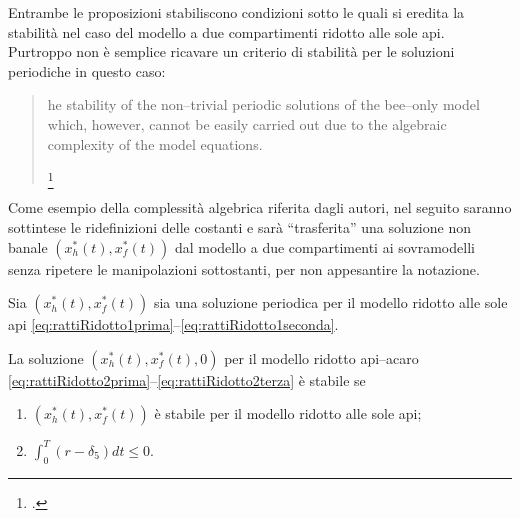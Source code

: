 Entrambe le proposizioni stabiliscono condizioni sotto le quali si eredita la stabilità nel caso del modello
a due compartimenti ridotto alle sole api. Purtroppo non è semplice ricavare un criterio di stabilità per le
soluzioni periodiche in questo caso:
\blockquote[{\footcite[18]{ratti2017}}]
{
\omissis [T]he stability of the non--trivial periodic solutions of the bee--only model which, however,
cannot be easily carried out due to the algebraic complexity of the model equations.
}

Come esempio della complessità algebrica riferita dagli autori, nel seguito saranno sottintese le
ridefinizioni delle costanti e sarà ``trasferita'' una soluzione non banale $\left({ x_h^* (t), x_f^*(t) }\right)$
dal modello a due compartimenti ai sovramodelli senza ripetere le manipolazioni sottostanti, per non appesantire la
notazione.

\begin{proposizione}
    Sia $\left( x_h^*(t), x_f^*(t) \right)$ sia una soluzione periodica per il modello ridotto alle sole api \eqref{eq:rattiRidotto1prima}--\eqref{eq:rattiRidotto1seconda}.

    La soluzione $\left( x_h^*(t), x_f^*(t), 0 \right)$ per il modello ridotto api--acaro
    \eqref{eq:rattiRidotto2prima}--\eqref{eq:rattiRidotto2terza} è stabile se
    \begin{enumerate}
        \item $\left( x_h^*(t), x_f^*(t) \right)$ è stabile per il modello ridotto alle sole api;
        \item $\int_0^T (r - \delta_5) dt \leq 0$.
    \end{enumerate}
\end{proposizione}

